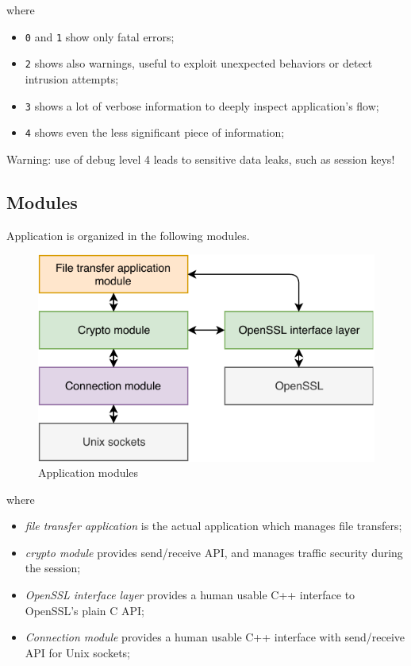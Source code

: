 \documentclass[a4paper,12pt]{article}
\begin{document}

where
\begin{itemize}
  \item \texttt{0} and \texttt{1} show only fatal errors;
  \item \texttt{2} shows also warnings, useful to exploit unexpected behaviors or detect intrusion attempts;
  \item \texttt{3} shows a lot of verbose information to deeply inspect application's flow;
  \item \texttt{4} shows even the less significant piece of information;
\end{itemize}

Warning: use of debug level 4 leads to sensitive data leaks, such as session keys!

\subsection{Modules}
Application is organized in the following modules.

\begin{figure}[H]
  \centering
  \includegraphics{img/modules.pdf}
  \caption{Application modules}
  \label{img:modules}
\end{figure}

where
\begin{itemize}
  \item \emph{file transfer application} is the actual application which manages file transfers;
  \item \emph{crypto module} provides send/receive API, and manages traffic security during the session;
  \item \emph{OpenSSL interface layer} provides a human usable C++ interface to OpenSSL's plain C API;
  \item \emph{Connection module} provides a human usable C++ interface with send/receive API for Unix sockets;
\end{itemize}
\end{document}
